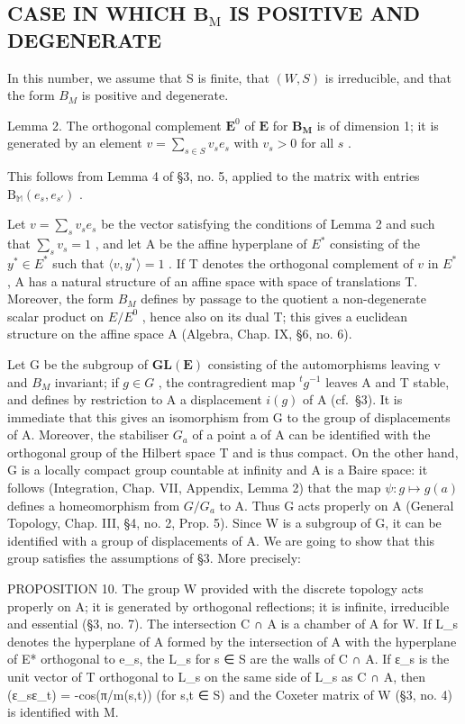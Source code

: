 \subsection{\texorpdfstring{CASE IN WHICH \(\mathbf{B}_{\mathrm{M}}\) IS POSITIVE AND DEGENERATE}{CASE IN WHICH B\_M IS POSITIVE AND DEGENERATE}}

In this number, we assume that S is finite, that \((W, S)\) is irreducible, and that the form \(B_{M}\) is positive and degenerate.

Lemma 2. The orthogonal complement \(\mathbf{E}^0\) of \(\mathbf{E}\) for \(\mathbf{B}_{\mathbf{M}}\) is of dimension 1; it is generated by an element \(v = \sum_{s\in S}v_s e_s\) with \(v_{s} > 0\) for all \(s\) .

This follows from Lemma 4 of §3, no. 5, applied to the matrix with entries \(\mathrm{B}_{\mathbb{M}}(e_s, e_{s'})\) .

Let \(v = \sum_{s} v_s e_s\) be the vector satisfying the conditions of Lemma 2 and such that \(\sum_{s} v_s = 1\) , and let A be the affine hyperplane of \(E^*\) consisting of the \(y^* \in E^*\) such that \(\langle v, y^* \rangle = 1\) . If T denotes the orthogonal complement of \(v\) in \(E^*\) , A has a natural structure of an affine space with space of translations T. Moreover, the form \(B_M\) defines by passage to the quotient a non-degenerate scalar product on \(E/E^0\) , hence also on its dual T; this gives a euclidean structure on the affine space A (Algebra, Chap. IX, §6, no. 6).

Let G be the subgroup of \(\mathbf{GL}(\mathbf{E})\) consisting of the automorphisms leaving v and \(B_{M}\) invariant; if \(g \in G\) , the contragredient map \({}^{t}g^{-1}\) leaves A and T stable, and defines by restriction to A a displacement \(i(g)\) of A (cf.~§3). It is immediate that this gives an isomorphism from G to the group of displacements of A. Moreover, the stabiliser \(G_{a}\) of a point a of A can be identified with the orthogonal group of the Hilbert space T and is thus compact. On the other hand, G is a locally compact group countable at infinity and A is a Baire space: it follows (Integration, Chap. VII, Appendix, Lemma 2) that the map \(\psi : g \mapsto g(a)\) defines a homeomorphism from \(G/G_a\) to A. Thus G acts properly on A (General Topology, Chap. III, §4, no. 2, Prop. 5). Since W is a subgroup of G, it can be identified with a group of displacements of A. We are going to show that this group satisfies the assumptions of §3. More precisely:

PROPOSITION 10. The group W provided with the discrete topology acts properly on A; it is generated by orthogonal reflections; it is infinite, irreducible and essential (§3, no. 7). The intersection C ∩ A is a chamber of A for W. If L\_s denotes the hyperplane of A formed by the intersection of A with the hyperplane of E* orthogonal to e\_s, the L\_s for s ∈ S are the walls of C ∩ A. If ε\_s is the unit vector of T orthogonal to L\_s on the same side of L\_s as C ∩ A, then (ε\_s\textbar ε\_t) = -cos(π/m(s,t)) (for s,t ∈ S) and the Coxeter matrix of W (§3, no. 4) is identified with M.

